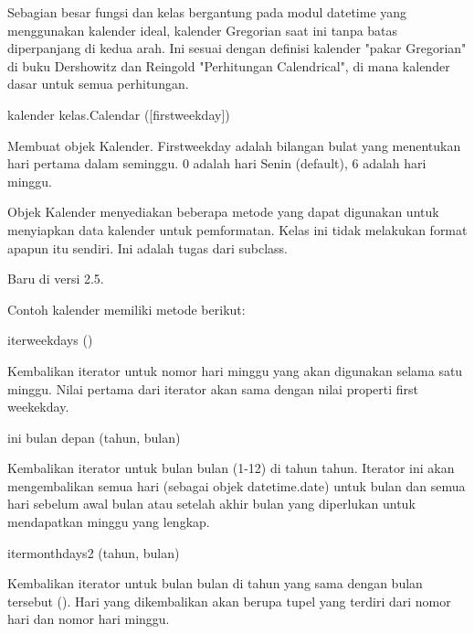\vspace{12pt}
\noindent 
Sebagian besar fungsi dan kelas bergantung pada modul datetime yang menggunakan kalender ideal, kalender Gregorian saat ini tanpa batas diperpanjang di kedua arah. Ini sesuai dengan definisi kalender "pakar Gregorian" di buku Dershowitz dan Reingold "Perhitungan Calendrical", di mana kalender dasar untuk semua perhitungan. \par
\vspace{12pt}
\noindent 
kalender kelas.Calendar ([firstweekday]) \par
\noindent 
Membuat objek Kalender. Firstweekday adalah bilangan bulat yang menentukan hari pertama dalam seminggu. 0 adalah hari Senin (default), 6 adalah hari minggu. \par
\vspace{12pt}
\noindent 
Objek Kalender menyediakan beberapa metode yang dapat digunakan untuk menyiapkan data kalender untuk pemformatan. Kelas ini tidak melakukan format apapun itu sendiri. Ini adalah tugas dari subclass. \par
\vspace{12pt}
\noindent 
Baru di versi 2.5. \par
\vspace{12pt}
\noindent 
Contoh kalender memiliki metode berikut: \par
\vspace{12pt}
\noindent 
iterweekdays () \par
\noindent 
Kembalikan iterator untuk nomor hari minggu yang akan digunakan selama satu minggu. Nilai pertama dari iterator akan sama dengan nilai properti first weekekday. \par
\vspace{12pt}
\noindent 
ini bulan depan (tahun, bulan) \par
\noindent 
Kembalikan iterator untuk bulan bulan (1-12) di tahun tahun. Iterator ini akan mengembalikan semua hari (sebagai objek datetime.date) untuk bulan dan semua hari sebelum awal bulan atau setelah akhir bulan yang diperlukan untuk mendapatkan minggu yang lengkap. \par
\vspace{12pt}
\noindent 
itermonthdays2 (tahun, bulan) \par
\noindent 
Kembalikan iterator untuk bulan bulan di tahun yang sama dengan bulan tersebut (). Hari yang dikembalikan akan berupa tupel yang terdiri dari nomor hari dan nomor hari minggu. \par
\vspace{12pt}
